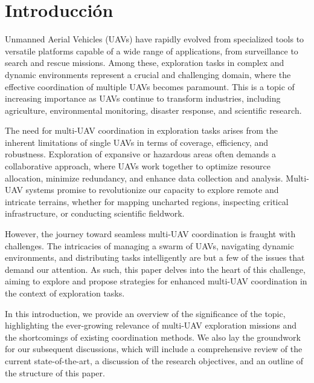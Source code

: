 \documentclass[sigconf]{acmart}
\begin{document}

\maketitle

\section{Introducción}

Unmanned Aerial Vehicles (UAVs) have rapidly evolved from specialized tools to versatile platforms capable of a wide range of applications, from surveillance to search and rescue missions. Among these, exploration tasks in complex and dynamic environments represent a crucial and challenging domain, where the effective coordination of multiple UAVs becomes paramount. This is a topic of increasing importance as UAVs continue to transform industries, including agriculture, environmental monitoring, disaster response, and scientific research.

The need for multi-UAV coordination in exploration tasks arises from the inherent limitations of single UAVs in terms of coverage, efficiency, and robustness. Exploration of expansive or hazardous areas often demands a collaborative approach, where UAVs work together to optimize resource allocation, minimize redundancy, and enhance data collection and analysis. Multi-UAV systems promise to revolutionize our capacity to explore remote and intricate terrains, whether for mapping uncharted regions, inspecting critical infrastructure, or conducting scientific fieldwork.

However, the journey toward seamless multi-UAV coordination is fraught with challenges. The intricacies of managing a swarm of UAVs, navigating dynamic environments, and distributing tasks intelligently are but a few of the issues that demand our attention. As such, this paper delves into the heart of this challenge, aiming to explore and propose strategies for enhanced multi-UAV coordination in the context of exploration tasks.

In this introduction, we provide an overview of the significance of the topic, highlighting the ever-growing relevance of multi-UAV exploration missions and the shortcomings of existing coordination methods. We also lay the groundwork for our subsequent discussions, which will include a comprehensive review of the current state-of-the-art, a discussion of the research objectives, and an outline of the structure of this paper.
\end{document}
